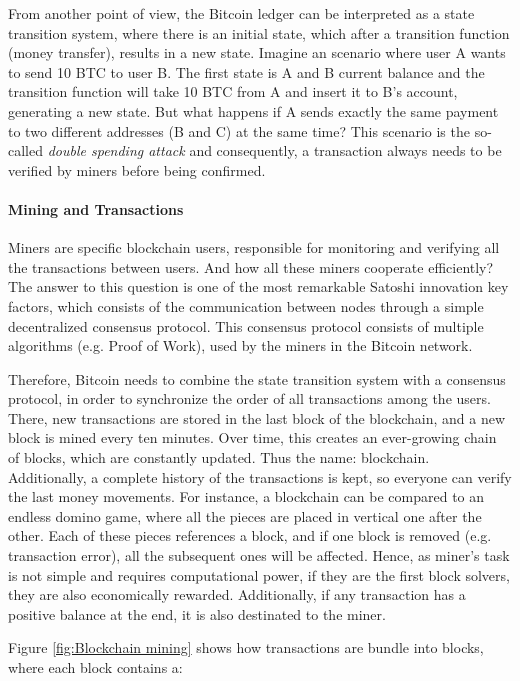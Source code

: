 From another point of view, the Bitcoin ledger can be interpreted as a state transition system, where there is an initial state, which after a transition function (money transfer), results in a new state. Imagine an scenario where user A wants to send 10 BTC to user B. The first state is A and B current balance and the transition function will take 10 BTC from A and insert it to B's account, generating a new state. But what happens if A sends exactly the same payment to two different addresses (B and C) at the same time? This scenario is the so-called \textit{double spending attack} and consequently, a transaction always needs to be verified by miners before being confirmed. 

\paragraph{Mining and Transactions}

Miners are specific blockchain users, responsible for monitoring and verifying all the transactions between users. And how all these miners cooperate efficiently? The answer to this question is one of the most remarkable Satoshi innovation key factors, which consists of the communication between nodes through a simple decentralized consensus protocol. This consensus protocol consists of multiple algorithms (e.g. Proof of Work), used by the miners in the Bitcoin network.

Therefore, Bitcoin needs to combine the state transition system with a consensus protocol, in order to synchronize the order of all transactions among the users. There, new transactions are stored in the last block of the blockchain, and a new block is mined every ten minutes. Over time, this creates an ever-growing chain of blocks, which are constantly updated. Thus the name: blockchain. Additionally, a complete history of the transactions is kept, so everyone can verify the last money movements. For instance, a blockchain can be compared to an endless domino game, where all the pieces are placed in vertical one after the other. Each of these pieces references a block, and if one block is removed (e.g. transaction error), all the subsequent ones will be affected. Hence, as miner's task is not simple and requires computational power, if they are the first block solvers, they are also economically rewarded. Additionally, if any transaction has a positive balance at the end, it is also destinated to the miner.

Figure \ref{fig:Blockchain mining} shows how transactions are bundle into blocks, where each block contains a:

